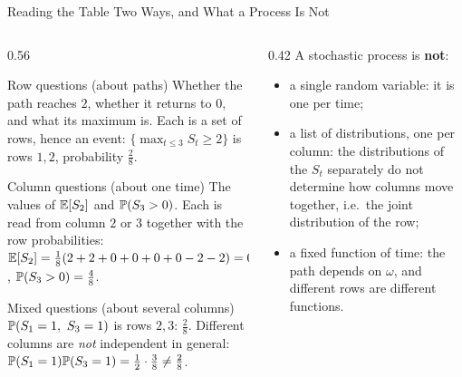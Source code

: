 \begin{frame}{Reading the Table Two Ways, and What a Process Is Not}
  \label{fr:reading}
  \small
  \begin{columns}[T]
    \begin{column}{0.56\textwidth}
      \begin{block}{Row questions (about paths)}
        Whether the path reaches $2$, whether it returns to $0$, and what its maximum is. Each is a set of rows, hence an event: $\{\max_{t\le3}S_t\ge2\}$ is rows $1,2$, probability $\tfrac28$.
      \end{block}
      \begin{block}{Column questions (about one time)}
        The values of $\mathbb{E}[S_2]$ and $\mathbb{P}(S_3>0)$. Each is read from column $2$ or $3$ together with the row probabilities: $\mathbb{E}[S_2]=\tfrac18(2+2+0+0+0+0-2-2)=0$, $\mathbb{P}(S_3>0)=\tfrac48$.
      \end{block}
      \begin{block}{Mixed questions (about several columns)}
        $\mathbb{P}(S_1=1,\ S_3=1)$ is rows $2,3$: $\tfrac28$. Different columns are \emph{not} independent in general: $\mathbb{P}(S_1=1)\mathbb{P}(S_3=1)=\tfrac12\cdot\tfrac38\ne\tfrac28$.
      \end{block}
    \end{column}
    \begin{column}{0.42\textwidth}
      A stochastic process is \textbf{not}:
      \begin{itemize}
        \item a single random variable: it is one per time;
        \item a list of distributions, one per column: the distributions of the $S_t$ separately do not determine how columns move together, i.e.\ the joint distribution of the row;
        \item a fixed function of time: the path depends on $\omega$, and different rows are different functions.
      \end{itemize}
    \end{column}
  \end{columns}
\end{frame}


